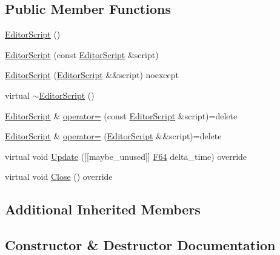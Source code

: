 \subsection*{Public Member Functions}
\begin{DoxyCompactItemize}
\item 
\hyperlink{classmage_1_1script_1_1_editor_script_a32bf732aa1181653b593dd08616331c1}{Editor\+Script} ()
\item 
\hyperlink{classmage_1_1script_1_1_editor_script_a1db5b28c5f052f476173667572400998}{Editor\+Script} (const \hyperlink{classmage_1_1script_1_1_editor_script}{Editor\+Script} \&script)
\item 
\hyperlink{classmage_1_1script_1_1_editor_script_ac7db9f4ad73fc58c371aaf754009404e}{Editor\+Script} (\hyperlink{classmage_1_1script_1_1_editor_script}{Editor\+Script} \&\&script) noexcept
\item 
virtual \hyperlink{classmage_1_1script_1_1_editor_script_a1454bd68e4111691b6e287966dfd252a}{$\sim$\+Editor\+Script} ()
\item 
\hyperlink{classmage_1_1script_1_1_editor_script}{Editor\+Script} \& \hyperlink{classmage_1_1script_1_1_editor_script_a6970965ac503d8c6566268c6d5b78da1}{operator=} (const \hyperlink{classmage_1_1script_1_1_editor_script}{Editor\+Script} \&script)=delete
\item 
\hyperlink{classmage_1_1script_1_1_editor_script}{Editor\+Script} \& \hyperlink{classmage_1_1script_1_1_editor_script_a7d5c9e19fbdfd81156c623c54dd45709}{operator=} (\hyperlink{classmage_1_1script_1_1_editor_script}{Editor\+Script} \&\&script)=delete
\item 
virtual void \hyperlink{classmage_1_1script_1_1_editor_script_a6c8c31a738ed0dff9fd3418f55cef21c}{Update} (\mbox{[}\mbox{[}maybe\+\_\+unused\mbox{]}\mbox{]} \hyperlink{namespacemage_ad26233bbec640deda836e572c1a23708}{F64} delta\+\_\+time) override
\item 
virtual void \hyperlink{classmage_1_1script_1_1_editor_script_af6093dd776e3822045f452515662463e}{Close} () override
\end{DoxyCompactItemize}
\subsection*{Additional Inherited Members}


\subsection{Constructor \& Destructor Documentation}
\hypertarget{classmage_1_1script_1_1_editor_script_a32bf732aa1181653b593dd08616331c1}{}\label{classmage_1_1script_1_1_editor_script_a32bf732aa1181653b593dd08616331c1} 

